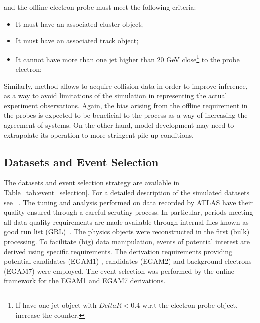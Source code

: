 and the offline electron probe must meet the following criteria:

\begin{itemize}
  \item It must have an associated cluster object;
  \item It must have an associated track object;
  \item It cannot have more than one jet higher than 20 GeV close\footnote{If have one jet object with $DeltaR < 0.4$ w.r.t the 
  electron probe object, increase the counter.} to the probe electron;
\end{itemize}



Similarly, \tnp method allows to acquire collision data in order to improve
inference, as a way to avoid limitations of the simulation in representing the
actual experiment observations. Again, the bias arising from the offline
requirement in the probes is expected to be beneficial to the process as a way
of increasing the agreement of systems. On the other hand, model
development may need to extrapolate its operation to more stringent
pile-up conditions.

\subsection{Datasets and Event Selection}%
\label{ssec:dataset}

The datasets and event selection strategy are available in
Table~\ref{tab:event_selection}. For a detailed description of the simulated
datasets see ~\cite[Section 3]{ATLAS-PERF-2017-01-002}. The tuning and analysis
performed on data recorded by ATLAS have their quality ensured through a careful
scrutiny process. In particular, periods meeting all data-quality requirements
are made available through internal files known as good run list
(GRL)~\cite{grl_site}. The physics objects were reconstructed in the first
(bulk) processing. To facilitate (big) data manipulation, events of potential
interest are derived using specific requirements. The derivation requirements
providing potential \Zee{} \tnp{} candidates (EGAM1) , \Jee{} \tnp{} candidates
(EGAM2) and background electrons (EGAM7) were employed. The event selection was
performed by the online framework for the EGAM1 and EGAM7 derivations.%




